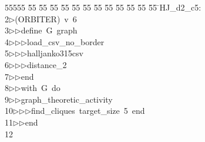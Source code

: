 %
%
\begin{tabbing}
55555 \= 55 \= 55 \= 55 \= 55 \= 55 \= 55 \= 55 \= 55 \= 55 \= 55 \= 55 \= 55 \= \>HJ\_d2\_c5:\\[0pt]
2\>$\triangleright$\>(ORBITER)\ v\ 6\ \\[0pt]
3\>$\triangleright$\>$\triangleright$\>define\ G\ graph\ \\[0pt]
4\>$\triangleright$\>$\triangleright$\>$\triangleright$\>load\_csv\_no\_border\ \\[0pt]
5\>$\triangleright$\>$\triangleright$\>$\triangleright$\>halljanko315csv\ \\[0pt]
6\>$\triangleright$\>$\triangleright$\>$\triangleright$\>distance\_2\ \\[0pt]
7\>$\triangleright$\>$\triangleright$\>end\ \\[0pt]
8\>$\triangleright$\>$\triangleright$\>with\ G\ do\ \\[0pt]
9\>$\triangleright$\>$\triangleright$\>graph\_theoretic\_activity\ \\[0pt]
10\>$\triangleright$\>$\triangleright$\>$\triangleright$\>find\_cliques\ target\_size\ 5\ end\ \\[0pt]
11\>$\triangleright$\>$\triangleright$\>end\\[0pt]
12\>\end{tabbing}
